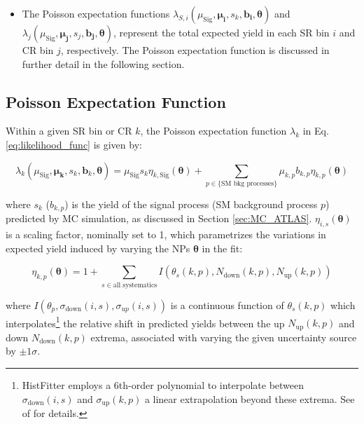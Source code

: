 \begin{itemize}
    \item The Poisson expectation functions \(\lambda_{S,i}(\mu_\text{Sig}, \boldsymbol{\mu_i}, s_k, \boldsymbol{b_i}, \boldsymbol{\theta})\) and \(\lambda_j(\mu_\text{Sig}, \boldsymbol{\mu_j}, s_j, \boldsymbol{b_j}, \boldsymbol{\theta})\), represent the total expected yield in each SR bin \(i\) and CR bin \(j\), respectively. The Poisson expectation function is discussed in further detail in the following section.
\end{itemize}

\subsection{Poisson Expectation Function}
\label{sec:poisson_exp}

Within a given SR bin or CR \(k\), the Poisson expectation function \(\lambda_k\) in Eq. \ref{eq:likelihood_func} is given by:
    
\begin{equation}
\label{eq:lambda}
        \lambda_k(\mu_\text{Sig}, \boldsymbol{\mu_k}, s_k, \boldsymbol{b}_k, \boldsymbol{\theta}) = \mu_\text{Sig}s_k\eta_{k, \text{Sig}}(\boldsymbol{\theta}) + \sum\limits_{p\in{\text{\{SM bkg processes\}}}} \mu_{k,p} b_{k,p}\eta_{k,p}(\boldsymbol{\theta})
\end{equation}
    
\noindent where \(s_k\) (\(b_{k,p}\)) is the yield of the signal process (SM background process \(p\)) predicted by MC simulation, as discussed in Section \ref{sec:MC_ATLAS}. \(\eta_{i,s}(\boldsymbol{\theta})\) is a scaling factor, nominally set to 1, which parametrizes the variations in expected yield induced by varying the NPs \(\boldsymbol{\theta}\) in the fit:

        \begin{equation}
            \label{eq:sigma}
            \eta_{k,p}(\boldsymbol{\theta}) = 1 + \sum_{s\in\text{all systematics}}I(\theta_s(k,p), N_\text{down}(k,p), N_\text{up}(k,p))
        \end{equation}

        where \(I(\theta_p, \sigma_\text{down}(i,s), \sigma_{up}(i,s))\) is a continuous function of \(\theta_s(k,p)\) which interpolates\footnote{HistFitter employs a 6th-order polynomial to interpolate between  \(\sigma_\text{down}(i,s)\) and \(\sigma_\text{up}(k,p)\) a linear extrapolation beyond these extrema. See  of  for details.} the relative shift in predicted yields between the up \(N_\text{up}(k, p)\) and down \(N_\text{down}(k, p)\) extrema, associated with varying the given uncertainty source by \(\pm1\sigma\). 

